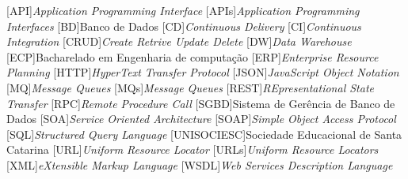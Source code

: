 
[API]{\emph{Application Programming Interface}}
[APIs]{\emph{Application Programming Interfaces}}
[BD]{Banco de Dados}
[CD]{\emph{Continuous Delivery}}
[CI]{\emph{Continuous Integration}}
[CRUD]{\emph{Create Retrive Update Delete}}
[DW]{\emph{Data Warehouse}}
[ECP]{Bacharelado em Engenharia de computação}
[ERP]{\emph{Enterprise Resource Planning}}
[HTTP]{\emph{HyperText Transfer Protocol}}
[JSON]{\emph{JavaScript Object Notation}}
[MQ]{\emph{Message Queues}}
[MQs]{\emph{Message Queues}}
[REST]{\emph{REpresentational State Transfer}}
[RPC]{\emph{Remote Procedure Call}}
[SGBD]{Sistema de Gerência de Banco de Dados}
[SOA]{\emph{Service Oriented Architecture}}
[SOAP]{\emph{Simple Object Access Protocol}}
[SQL]{\emph{Structured Query Language}}
[UNISOCIESC]{Sociedade Educacional de Santa Catarina}
[URL]{\emph{Uniform Resource Locator}}
[URLs]{\emph{Uniform Resource Locators}}
[XML]{\emph{eXtensible Markup Language}}
[WSDL]{\emph{Web Services Description Language}}
